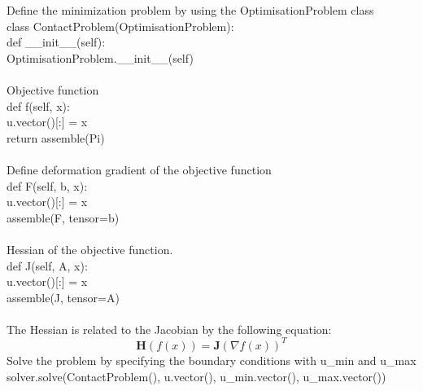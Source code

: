 \documentclass[12pt,3p]{article}
\begin{document}
Define the minimization problem by using the OptimisationProblem class \\
{\selectfont
class ContactProblem(OptimisationProblem): \\
\indent \indent def \_\_init\_\_(self): \\
\indent \indent \indent \indent OptimisationProblem.\_\_init\_\_(self) \\ \\
} 
Objective function \\
{\selectfont
\indent \indent  def f(self, x): \\
\indent \indent \indent \indent u.vector()[:] = x \\
\indent \indent \indent \indent return assemble(Pi) \\ \\
}
Define deformation gradient of the objective function \\
{\selectfont
\indent \indent def F(self, b, x): \\
\indent \indent \indent \indent u.vector()[:] = x \\
\indent \indent \indent \indent assemble(F, tensor=b) \\ \\
}
Hessian of the objective function. \\
{\selectfont
\indent \indent def J(self, A, x): \\
\indent \indent \indent \indent u.vector()[:] = x \\
\indent \indent \indent \indent assemble(J, tensor=A) \\ \\
}
The Hessian is related to the Jacobian by the following equation:
\begin{equation*}
\mathbf{H}(f(x)) = \mathbf{J} (\nabla f(x))^T
\end{equation*}
Solve the problem by specifying the boundary conditions with u\_min and u\_max  \\
{\selectfont
solver.solve(ContactProblem(), u.vector(), u\_min.vector(), u\_max.vector())
}
\end{document}
